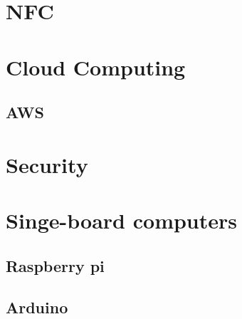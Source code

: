 \documentclass[12pt]{report}
\begin{document}
\section{NFC}


\section{Cloud Computing}



\subsection{AWS}


\section{Security}


\section{Singe-board computers}



\subsection{Raspberry pi}


\subsection{Arduino} %

\end{document}
